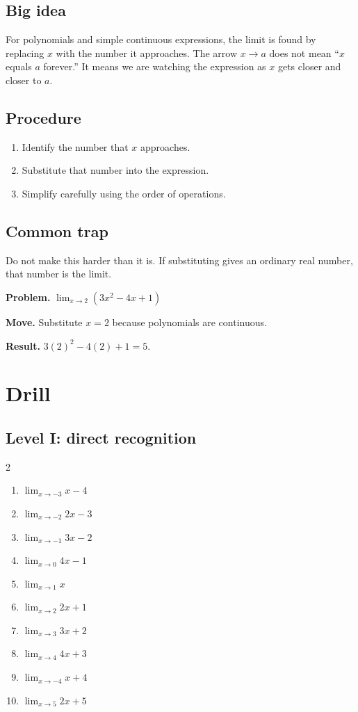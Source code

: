 \documentclass[11pt,oneside]{book}
\newenvironment{examplebox}[1]{\par\medskip\noindent{\color{steel}\bfseries #1}\par\noindent{\color{steel}\hrule}\smallskip}{\par\smallskip\noindent{\color{steel}\hrule}\par\medskip}
\begin{document}
\subsection*{Big idea}
For polynomials and simple continuous expressions, the limit is found by replacing $x$ with the number it approaches. The arrow $x\to a$ does not mean ``$x$ equals $a$ forever.'' It means we are watching the expression as $x$ gets closer and closer to $a$.

\subsection*{Procedure}
\begin{enumerate}[leftmargin=*]
\item Identify the number that $x$ approaches.
\item Substitute that number into the expression.
\item Simplify carefully using the order of operations.
\end{enumerate}

\subsection*{Common trap}
Do not make this harder than it is. If substituting gives an ordinary real number, that number is the limit.
\begin{examplebox}{Worked example}
\textbf{Problem.} $\displaystyle \lim_{x\to 2}(3x^2-4x+1)$

\textbf{Move.} Substitute $x=2$ because polynomials are continuous.

\textbf{Result.} $3(2)^2-4(2)+1=5$.
\end{examplebox}
\section*{Drill}
\subsection*{Level I: direct recognition}
\begin{multicols}{2}
\begin{enumerate}[leftmargin=*,label=\textbf{\arabic*.},itemsep=0.65\baselineskip]
\item $\displaystyle \lim_{x \to -3} x - 4$
\item $\displaystyle \lim_{x \to -2} 2 x - 3$
\item $\displaystyle \lim_{x \to -1} 3 x - 2$
\item $\displaystyle \lim_{x \to 0} 4 x - 1$
\item $\displaystyle \lim_{x \to 1} x$
\item $\displaystyle \lim_{x \to 2} 2 x + 1$
\item $\displaystyle \lim_{x \to 3} 3 x + 2$
\item $\displaystyle \lim_{x \to 4} 4 x + 3$
\item $\displaystyle \lim_{x \to -4} x + 4$
\item $\displaystyle \lim_{x \to 5} 2 x + 5$
\end{enumerate}
\end{multicols}
\end{document}
